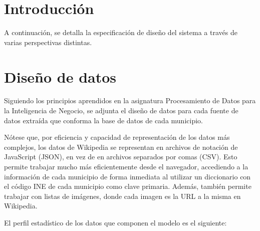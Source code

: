 \label{diseno}

\section{Introducción}

A continuación, se detalla la especificación de diseño del sistema a través de varias perspectivas distintas.

\section{Diseño de datos}

Siguiendo los principios aprendidos en la asignatura \guillemotleft Procesamiento de Datos para la Inteligencia de Negocio\guillemotright, se adjunta el diseño de datos para cada fuente de datos extraída que conforma la base de datos de cada municipio.


Nótese que, por eficiencia y capacidad de representación de los datos más complejos, los datos de Wikipedia se representan en archivos de notación de JavaScript (JSON), en vez de en archivos separados por comas (CSV). Esto permite trabajar mucho más eficientemente desde el navegador, accediendo a la información de cada municipio de forma inmediata al utilizar un diccionario con el código INE de cada municipio como clave primaria. Además, también permite trabajar con listas de imágenes, donde cada imagen es la URL a la misma en Wikipedia.

El perfil estadístico de los datos que componen el modelo es el siguiente:

